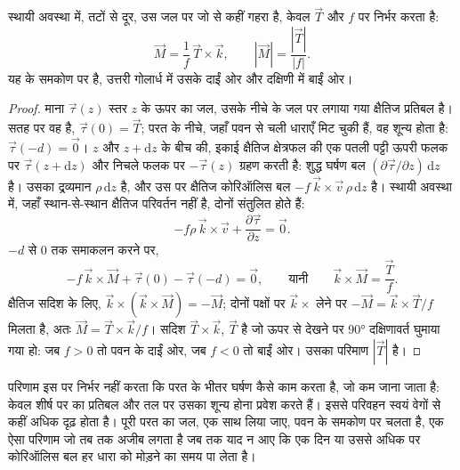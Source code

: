 \begin{theorem}\label{thm:b1:ocean-circulation:ekman}
स्थायी अवस्था में, तटों से दूर, उस जल पर जो  से कहीं गहरा है,  केवल  $\vec T$ और  $f$ पर निर्भर करता है:
\[
  \vec M = \frac{1}{f}\,\vec T\times\vec k,
  \qquad |\vec M| = \frac{|\vec T|}{|f|}.
\]
यह  के समकोण पर है, उत्तरी गोलार्ध में उसके दाईं ओर और दक्षिणी में बाईं ओर।
\end{theorem}

\begin{proof}
माना $\vec\tau(z)$ स्तर $z$ के ऊपर का जल, उसके नीचे के जल पर लगाया गया क्षैतिज प्रतिबल है।
सतह पर वह  है, $\vec\tau(0) =
\vec T$; परत के नीचे, जहाँ पवन से चली धाराएँ मिट चुकी हैं, वह शून्य होता है:
$\vec\tau(-d) = \vec 0$। $z$ और $z + \mathrm dz$ के बीच की, इकाई क्षैतिज क्षेत्रफल की एक पतली पट्टी
ऊपरी फलक पर $\vec\tau(z + \mathrm dz)$ और
निचले फलक पर $-\vec\tau(z)$ ग्रहण करती है: शुद्ध घर्षण बल $(\partial\vec
\tau/\partial z)\,\mathrm dz$ है। उसका द्रव्यमान $\rho\,\mathrm dz$ है, और उस पर क्षैतिज
कोरिऑलिस बल $-f\,\vec k\times\vec v\,\rho\,\mathrm dz$ है। स्थायी
अवस्था में, जहाँ स्थान-से-स्थान क्षैतिज परिवर्तन नहीं है, दोनों संतुलित होते हैं:
\[
  -f\rho\,\vec k\times\vec v + \frac{\partial\vec\tau}{\partial z} = \vec 0 .
\]
$-d$ से $0$ तक समाकलन करने पर,
\[
  -f\,\vec k\times\vec M + \vec\tau(0) - \vec\tau(-d) = \vec 0,
  \qquad\text{यानी}\qquad \vec k\times\vec M = \frac{\vec T}{f}.
\]
क्षैतिज सदिश के लिए, $\vec k\times(\vec k\times\vec M) = -\vec M$; दोनों पक्षों पर
$\vec k\times$ लेने पर $-\vec M = \vec k\times\vec T/f$ मिलता है, अतः $\vec M =
\vec T\times\vec k/f$। सदिश $\vec T\times\vec k$, $\vec T$ है जो ऊपर से देखने पर
\ang{90} दक्षिणावर्त घुमाया गया हो: जब $f > 0$ तो पवन के दाईं ओर, जब $f < 0$ तो
बाईं ओर। उसका परिमाण $|\vec T|$ है।
\end{proof}

परिणाम इस पर निर्भर नहीं करता कि परत के भीतर घर्षण कैसे काम करता है, जो कम जाना जाता है: केवल शीर्ष पर का प्रतिबल और तल पर उसका शून्य होना प्रवेश करते हैं।
इससे परिवहन स्वयं वेगों से कहीं अधिक दृढ़ होता है। पूरी परत का जल, एक साथ लिया जाए, पवन के समकोण पर चलता है, एक ऐसा परिणाम जो तब तक अजीब लगता है जब तक याद न आए कि एक दिन या उससे अधिक पर कोरिऑलिस बल हर धारा को मोड़ने का समय पा लेता है।

